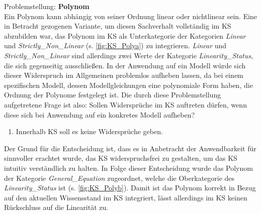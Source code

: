 Problemstellung: \textbf{Polynom}\\
Ein Polynom kann abhängig von seiner Ordnung linear oder nichtlinear sein. Eine in Betracht gezogenen Variante, um diesen Sachverhalt vollständig im KS abzubilden war, das Polynom im KS als Unterkategorie der Kategorien \textit{Linear} und \textit{Strictly\_Non\_Linear} (s. \autoref{fig:KS_Polya}) zu integrieren. \textit{Linear} und \textit{Strictly\_Non\_Linear} sind allerdings zwei Werte der Kategorie \textit{Linearity\_Status}, die sich gegenseitig ausschließen. In der Anwendung auf ein Modell würde sich dieser Widerspruch im Allgemeinen problemlos aufheben lassen, da bei einem spezifischen Modell, dessen Modellgleichungen eine polynomiale Form haben, die Ordnung der Polynome festgelegt ist. Die durch diese Problemstellung aufgetretene Frage ist also: Sollen Widersprüche im KS auftreten dürfen, wenn diese sich bei Anwendung auf ein konkretes Modell aufheben?
\begin{enumerate}[resume*]
	\item \label{E.KS_Widersprüche}Innerhalb KS soll es keine Widersprüche geben.
\end{enumerate}
Der Grund für die Entscheidung ist, dass es in Anbetracht der Anwendbarkeit für sinnvoller erachtet wurde, das KS widerspruchsfrei zu gestalten, um das KS intuitiv verständlich zu halten. In Folge dieser Entscheidung wurde das Polynom der Kategorie \textit{General\_Equation} zugeordnet, welche die Oberkategorie des \textit{Linearity\_Status} ist (s. \autoref{fig:KS_Polyb}). Damit ist das Polynom korrekt in Bezug auf den aktuellen Wissensstand im KS integriert, lässt allerdings im KS keinen Rückschluss auf die Linearität zu.

